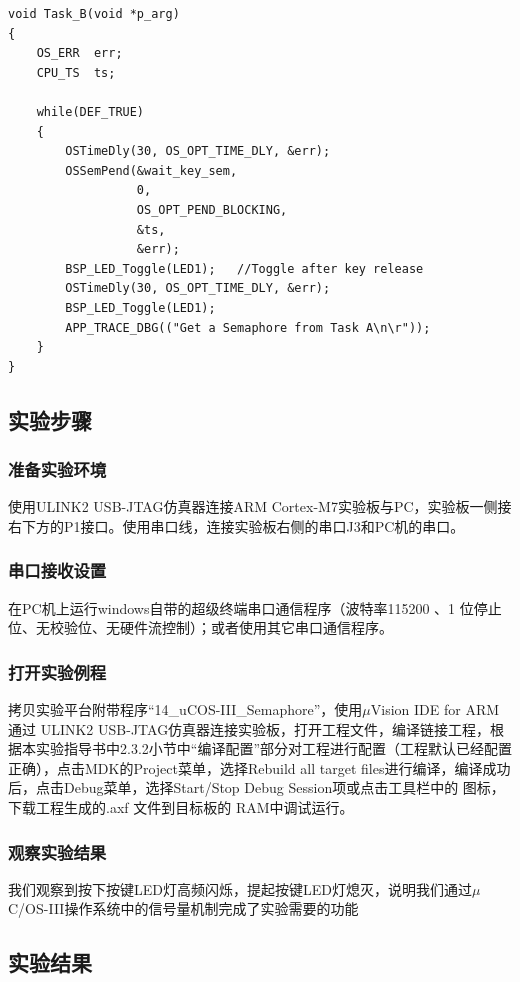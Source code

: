 ﻿\documentclass[UTF8,12pt]{article}
\begin{document}
\begin{lstlisting}[frame=shadowbox]
void Task_B(void *p_arg)
{			  
	OS_ERR  err;
	CPU_TS  ts;

	while(DEF_TRUE)
	{
		OSTimeDly(30, OS_OPT_TIME_DLY, &err);
		OSSemPend(&wait_key_sem,
                  0,
                  OS_OPT_PEND_BLOCKING,
                  &ts,
                  &err);
		BSP_LED_Toggle(LED1);	//Toggle after key release
        OSTimeDly(30, OS_OPT_TIME_DLY, &err);
        BSP_LED_Toggle(LED1);
		APP_TRACE_DBG(("Get a Semaphore from Task A\n\r"));
	}
}
\end{lstlisting}

\subsection{实验步骤}
\subsubsection{准备实验环境}
使用ULINK2 USB-JTAG仿真器连接ARM Cortex-M7实验板与PC，实验板一侧接右下方的P1接口。使用串口线，连接实验板右侧的串口J3和PC机的串口。

\subsubsection{串口接收设置}
在PC机上运行windows自带的超级终端串口通信程序（波特率115200 、1 位停止位、无校验位、无硬件流控制）；或者使用其它串口通信程序。

\subsubsection{打开实验例程}
拷贝实验平台附带程序“14\_uCOS-III\_Semaphore”，使用$\mu$Vision IDE for ARM通过 ULINK2 USB-JTAG仿真器连接实验板，打开工程文件，编译链接工程，根据本实验指导书中2.3.2小节中“编译配置”部分对工程进行配置（工程默认已经配置正确），点击MDK的Project菜单，选择Rebuild all target files进行编译，编译成功后，点击Debug菜单，选择Start/Stop Debug Session项或点击工具栏中的 图标，下载工程生成的.axf 文件到目标板的 RAM中调试运行。

\subsubsection{观察实验结果}
我们观察到按下按键LED灯高频闪烁，提起按键LED灯熄灭，说明我们通过$\mu$C/OS-III操作系统中的信号量机制完成了实验需要的功能

\subsection{实验结果}
\end{document}
